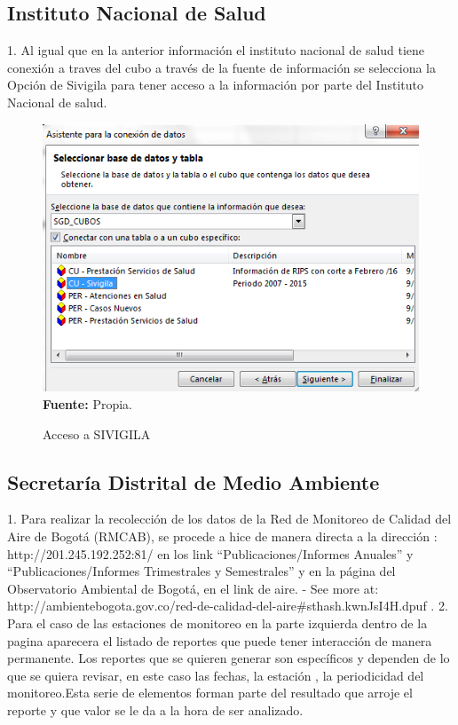 \documentclass[a4paper,openright,12pt]{book}
\theoremstyle{definition}
\theoremstyle{remark}
\begin{document}
\subsection{Instituto Nacional de Salud}

1. Al igual que en la anterior información el instituto nacional de salud tiene conexión a traves del cubo a través de la fuente de información se selecciona la Opción de Sivigila para tener acceso a la información por parte del Instituto Nacional de salud.

\begin{figure}[ht]
\centering
\caption{Acceso a SIVIGILA} 
\includegraphics[scale=0.6]{Rips5}
\label{fig:Rips6}
\\ \textbf{Fuente:} Propia.
\end{figure}

\subsection{Secretaría Distrital de Medio Ambiente}
1. Para realizar la recolección de los datos de la Red de Monitoreo de Calidad del Aire de Bogotá (RMCAB), se procede a hice de manera directa a la dirección : http://201.245.192.252:81/ en los link  “Publicaciones/Informes Anuales” y “Publicaciones/Informes Trimestrales y Semestrales” y en la página del Observatorio Ambiental de Bogotá,  en el link de aire. - See more at: 
http://ambientebogota.gov.co/red-de-calidad-del-aire\#sthash.kwnJsI4H.dpuf .
2. Para el caso de las estaciones de monitoreo en la parte  izquierda dentro de la pagina aparecera el listado de reportes que puede tener interacción de manera permanente. Los reportes que se quieren generar son específicos y dependen de lo que se quiera revisar, en este caso las fechas, la estación , la periodicidad del monitoreo.Esta serie de elementos forman parte del resultado que arroje el reporte y que valor se le da a la hora de ser analizado.
\end{document}
